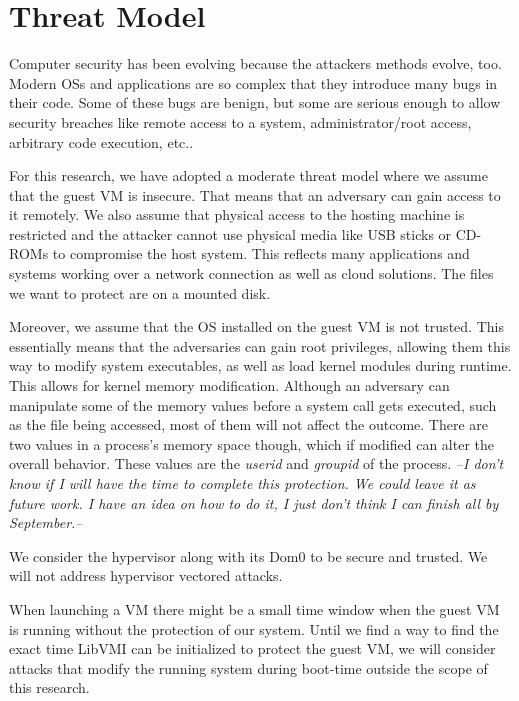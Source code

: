 \section{Threat Model}\label{sec:threat}

Computer security has been evolving because the attackers methods evolve, too. Modern \acp{OS} and applications are so complex that they introduce many bugs in their code. Some of these bugs are benign, but some are serious enough to allow security breaches like remote access to a system, administrator/root access, arbitrary code execution, etc..

\par For this research, we have adopted a moderate threat model where we assume that the guest \ac{VM} is insecure. That means that an adversary can gain access to it remotely. We also assume that physical access to the hosting machine is restricted and the attacker cannot use physical media like USB sticks or CD-ROMs to compromise the host system. This reflects many applications and systems working over a network connection as well as cloud solutions. The files we want to protect are on a mounted disk.

\par Moreover, we assume that the \ac{OS} installed on the guest \ac{VM} is not trusted. This essentially means that the adversaries can gain root privileges, allowing them this way to modify system executables, as well as load kernel modules during runtime. This allows for kernel memory modification. Although an adversary can manipulate some of the memory values before a system call gets executed, such as the file being accessed, most of them will not affect the outcome. There are two values in a process's memory space though, which if modified can alter the overall behavior. These values are the \emph{userid} and \emph{groupid} of the process. \emph{--I don't know if I will have the time to complete this protection. We could leave it as future work. I have an idea on how to do it, I just don't think I can finish all by September.--}

\par We consider the hypervisor along with its Dom0 to be secure and trusted. We will not address hypervisor vectored attacks.

\par When launching a \ac{VM} there might be a small time window when the guest \ac{VM} is running without the protection of our system. Until we find a way to find the exact time LibVMI can be initialized to protect the guest \ac{VM}, we will consider attacks that modify the running system during boot-time outside the scope of this research.

